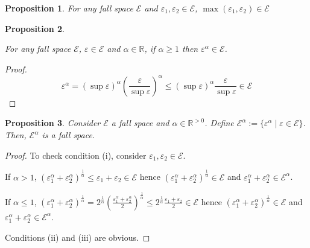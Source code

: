 \documentclass{article}
\numberwithin{equation}{section}
\theoremstyle{definition}
\theoremstyle{plain}
\newtheorem{proposition}{Proposition}[section]
\newcommand{\Reals}{\mathbb{R}}
\newcommand{\Fall}{\mathcal{E}}
\begin{document}
\begin{proposition}

For any fall space $\Fall$ and $\varepsilon_1, \varepsilon_2 \in \Fall$, $\max(\varepsilon_1,\varepsilon_2) \in \Fall$

\end{proposition}


\begin{proposition}
\label{prp:fall_space_closed_wrt_power}

For any fall space $\Fall$, $\varepsilon \in \Fall$ and $\alpha \in \Reals$, if $\alpha \geq 1$ then $\varepsilon^\alpha \in \Fall$.

\end{proposition}

\begin{proof}

$$\varepsilon^\alpha = (\sup \varepsilon)^\alpha (\frac{\varepsilon}{\sup \varepsilon})^\alpha \leq  (\sup \varepsilon)^\alpha \frac{\varepsilon}{\sup \varepsilon} \in \Fall$$

\end{proof}

\begin{proposition}

Consider $\Fall$ a fall space and $\alpha \in \Reals^{>0}$. Define ${\Fall^\alpha := \{\varepsilon^\alpha \mid \varepsilon \in \Fall\}}$. Then, $\Fall^\alpha$ is a fall space.

\end{proposition}

\begin{proof}

To check condition (i), consider $\varepsilon_1, \varepsilon_2 \in \Fall$. 

If $\alpha > 1$, $(\varepsilon_1^\alpha + \varepsilon_2^\alpha)^\frac{1}{\alpha} \leq \varepsilon_1 + \varepsilon_2 \in \Fall$ hence $(\varepsilon_1^\alpha + \varepsilon_2^\alpha)^\frac{1}{\alpha} \in \Fall$ and $\varepsilon_1^\alpha + \varepsilon_2^\alpha \in \Fall^\alpha$.

If $\alpha \leq 1$, $(\varepsilon_1^\alpha + \varepsilon_2^\alpha)^\frac{1}{\alpha} = 2^\frac{1}{\alpha}(\frac{\varepsilon_1^\alpha + \varepsilon_2^\alpha}{2})^\frac{1}{\alpha} \leq 2^\frac{1}{\alpha} \frac{\varepsilon_1+\varepsilon_2}{2} \in \Fall$ hence $(\varepsilon_1^\alpha + \varepsilon_2^\alpha)^\frac{1}{\alpha} \in \Fall$ and $\varepsilon_1^\alpha + \varepsilon_2^\alpha \in \Fall^\alpha$.

Conditions (ii) and (iii) are obvious.

\end{proof}
\end{document}

